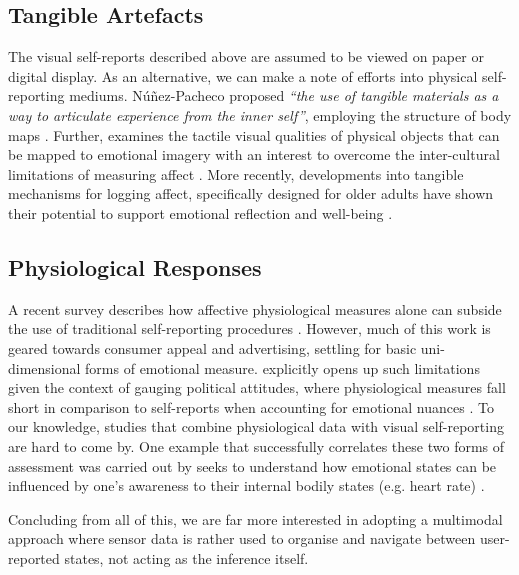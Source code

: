 \subsection{Tangible Artefacts}

The visual self-reports described above are assumed to be viewed on paper or digital display. As an alternative, we can make a note of efforts into physical self-reporting mediums. Núñez-Pacheco proposed \textit{“the use of tangible materials as a way to articulate experience from the inner self”}, employing the structure of body maps \cite{nunez-pacheco_tangible_2021}. Further, \citeauthor{isbister_sensual_2007} examines the tactile visual qualities of physical objects that can be mapped to emotional imagery with an interest to overcome the inter-cultural limitations of measuring affect \cite{isbister_sensual_2007}. More recently, developments into tangible mechanisms for logging affect, specifically designed for older adults have shown their potential to support emotional reflection and well-being \cite{gooch_designing_2022}.

\subsection{Physiological Responses}
A recent survey describes how affective physiological measures alone can subside the use of traditional self-reporting procedures \cite{barker_self-report_2016}. However, much of this work is geared towards consumer appeal and advertising, settling for basic uni-dimensional forms of emotional measure. \citeauthor{ciuk_measuring_2015} explicitly opens up such limitations given the context of gauging political attitudes, where physiological measures fall short in comparison to self-reports when accounting for emotional nuances \cite{ciuk_measuring_2015}. To our knowledge, studies that combine physiological data with visual self-reporting are hard to come by. One example that successfully correlates these two forms of assessment was carried out by \citeauthor{jung_role_2017} seeks to understand how emotional states can be influenced by one's awareness to their internal bodily states (e.g. heart rate) \cite{jung_role_2017}.

Concluding from all of this, we are far more interested in adopting a multimodal approach where sensor data is rather used to organise and navigate between user-reported states, not acting as the inference itself.


